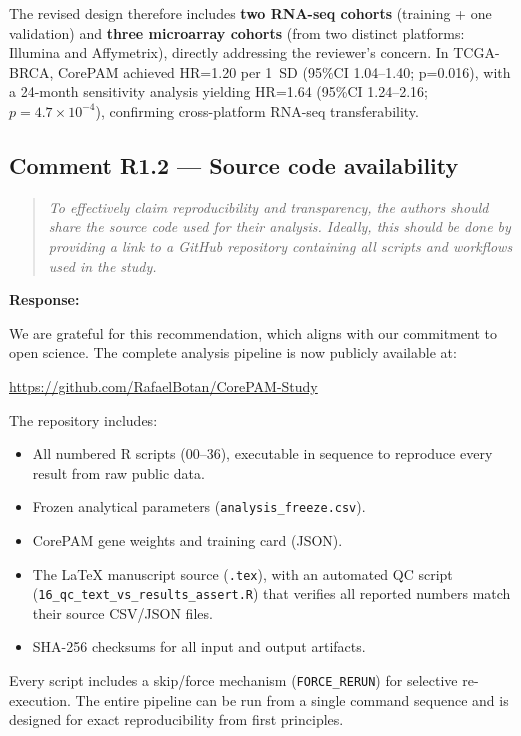 \documentclass[11pt]{article}
\newcommand{\reviewerquote}[1]{\begin{quote}\itshape #1\end{quote}}
\begin{document}
The revised design therefore includes \textbf{two RNA-seq cohorts} (training + one validation) and \textbf{three microarray cohorts} (from two distinct platforms: Illumina and Affymetrix), directly addressing the reviewer's concern. In TCGA-BRCA, CorePAM achieved HR=1.20 per 1~SD (95\%CI 1.04--1.40; p=0.016), with a 24-month sensitivity analysis yielding HR=1.64 (95\%CI 1.24--2.16; $p=4.7\times10^{-4}$), confirming cross-platform RNA-seq transferability.

\subsection*{Comment R1.2 --- Source code availability}

\reviewerquote{To effectively claim reproducibility and transparency, the authors should share the source code used for their analysis. Ideally, this should be done by providing a link to a GitHub repository containing all scripts and workflows used in the study.}

\noindent\textbf{Response:}

We are grateful for this recommendation, which aligns with our commitment to open science. The complete analysis pipeline is now publicly available at:

\begin{center}
\url{https://github.com/RafaelBotan/CorePAM-Study}
\end{center}

The repository includes:

\begin{itemize}
  \item All numbered R scripts (00--36), executable in sequence to reproduce every result from raw public data.
  \item Frozen analytical parameters (\texttt{analysis\_freeze.csv}).
  \item CorePAM gene weights and training card (JSON).
  \item The LaTeX manuscript source (\texttt{.tex}), with an automated QC script (\texttt{16\_qc\_text\_vs\_results\_assert.R}) that verifies all reported numbers match their source CSV/JSON files.
  \item SHA-256 checksums for all input and output artifacts.
\end{itemize}

Every script includes a skip/force mechanism (\texttt{FORCE\_RERUN}) for selective re-execution. The entire pipeline can be run from a single command sequence and is designed for exact reproducibility from first principles.
\end{document}
